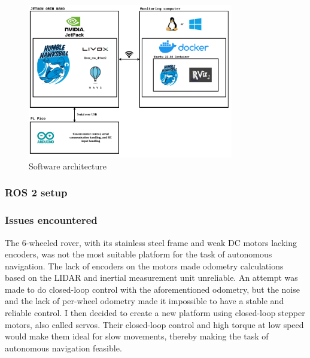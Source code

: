 \documentclass[11pt]{article}
\begin{document}
        \begin{figure}[H]
            \centering
            \includegraphics[width=0.8\textwidth]{Images/Software architecture rover.drawio.png}
            \caption{Software architecture}
            \label{fig:SW_architecture}
        \end{figure}


        \subsubsection{ROS 2 setup}
        

        \subsubsection{Issues encountered}
            

        The 6-wheeled rover, with its stainless steel frame and weak DC motors lacking encoders, was not the most suitable platform for the task of autonomous navigation. The lack of encoders on the motors made odometry calculations based on the LIDAR and inertial measurement unit unreliable. An attempt was made to do closed-loop control with the aforementioned odometry, but the noise and the lack of per-wheel odometry made it impossible to have a stable and reliable control. I then decided to create a new platform using closed-loop stepper motors, also called servos. Their closed-loop control and high torque at low speed would make them ideal for slow movements, thereby making the task of autonomous navigation feasible.
\end{document}
